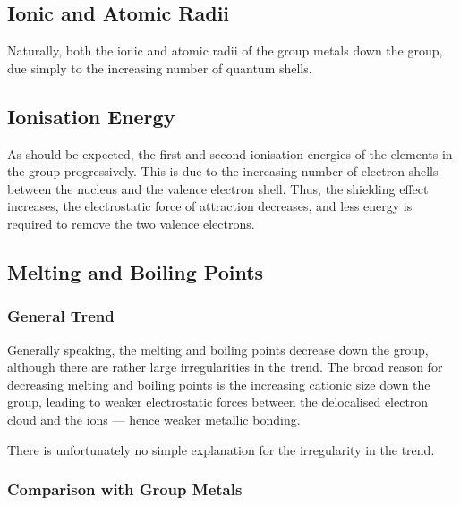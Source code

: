 




		\subsection{Ionic and Atomic Radii}

			Naturally, both the ionic and atomic radii of the group \rtwo{} metals  down the group, due simply to the increasing
			number of quantum shells.




		\pagebreak
		\subsection{Ionisation Energy}

			As should be expected, the first and second ionisation energies of the elements in the group  progressively. This is
			due to the increasing number of electron shells between the nucleus and the valence electron shell. Thus, the shielding effect
			increases, the electrostatic force of attraction decreases, and less energy is required to remove the two valence electrons.


		\subsection{Melting and Boiling Points}

			\subsubsection{General Trend}

				Generally speaking, the melting and boiling points decrease down the group, although there are rather large irregularities in
				the trend. The broad reason for decreasing melting and boiling points is the increasing cationic size down the group, leading
				to weaker electrostatic forces between the delocalised electron cloud and the ions --- hence weaker metallic bonding.

				There is unfortunately no simple explanation for the irregularity in the trend.



			\subsubsection{Comparison with Group  Metals}

